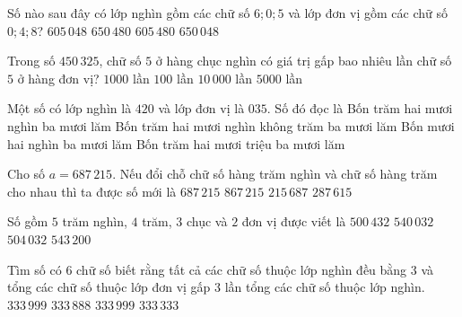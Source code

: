 \begin{ex} %
Số nào sau đây có lớp nghìn gồm các chữ số $6; 0; 5$ và lớp đơn vị gồm các chữ số $0; 4; 8$?
\choice
{\True $605\,048$}
{$650\,480$}
{$605\,480$}
{$650\,048$}
\end{ex}

\begin{ex} %
Trong số $450\,325$, chữ số $5$ ở hàng chục nghìn có giá trị gấp bao nhiêu lần chữ số $5$ ở hàng đơn vị?
\choice
{$1000$ lần}
{$100$ lần}
{\True $10\,000$ lần}
{$5000$ lần}
\end{ex}

\begin{ex} %
Một số có lớp nghìn là $420$ và lớp đơn vị là $035$. Số đó đọc là
\choice
{Bốn trăm hai mươi nghìn ba mươi lăm}
{\True Bốn trăm hai mươi nghìn không trăm ba mươi lăm}
{Bốn mươi hai nghìn ba mươi lăm}
{Bốn trăm hai mươi triệu ba mươi lăm}
\end{ex}

\begin{ex} %
Cho số $a = 687\,215$. Nếu đổi chỗ chữ số hàng trăm nghìn và chữ số hàng trăm cho nhau thì ta được số mới là
\choice
{$687\,215$}
{$867\,215$}
{$215\,687$}
{\True $287\,615$}
\end{ex}

\begin{ex} %
Số gồm $5$ trăm nghìn, $4$ trăm, $3$ chục và $2$ đơn vị được viết là
\choice
{\True $500\,432$}
{$540\,032$}
{$504\,032$}
{$543\,200$}
\end{ex}

\begin{ex} %
Tìm số có 6 chữ số biết rằng tất cả các chữ số thuộc lớp nghìn đều bằng 3 và tổng các chữ số thuộc lớp đơn vị gấp 3 lần tổng các chữ số thuộc lớp nghìn.
\choice
{$333\,999$}
{$333\,888$}
{\True $333\,999$}
{$333\,333$}
\end{ex}

